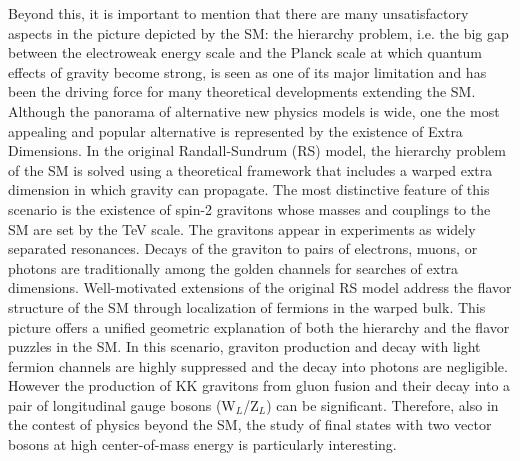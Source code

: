 \documentclass[10pt, a4paper]{article}
\begin{document}
Beyond this, it is important to mention that there are many unsatisfactory 
aspects in the picture depicted by the SM: the hierarchy problem, i.e. the big 
gap between the electroweak energy scale and the Planck scale at which 
quantum effects of gravity become strong, is seen as one of its major limitation 
and has been the driving force for many theoretical developments extending the 
SM. Although the panorama of alternative new physics models is wide, one the 
most appealing and popular alternative is represented by the existence of Extra Dimensions. 
In the original Randall-Sundrum (RS) model, the hierarchy problem
of the SM is solved using a theoretical framework that includes a warped extra dimension
in which gravity can propagate. 
The most distinctive feature of this scenario is the existence of spin-2 gravitons
whose masses and couplings to the SM are set by the TeV scale. The gravitons 
appear in experiments as widely separated resonances. 
Decays of the graviton to pairs of electrons, muons, or photons are traditionally among 
the golden channels for searches of extra dimensions.
Well-motivated extensions of the original RS model address the flavor structure of the SM through 
localization of fermions in the warped bulk. This picture offers a unified geometric explanation 
of both the hierarchy and the flavor puzzles in the SM.
In this scenario, graviton production and decay with light fermion channels are 
highly suppressed and the decay into photons are negligible. 
However the production of KK gravitons from gluon fusion and 
their decay into a pair of longitudinal gauge bosons (W$_L$/Z$_L$) can be significant.
Therefore, also in the contest of physics beyond the SM, the study of final 
states with two vector bosons at high center-of-mass energy is particularly interesting.



\end{document}
